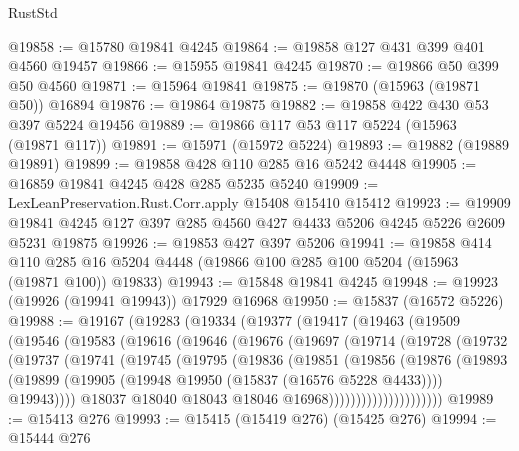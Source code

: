 \begin{lexlean}{RustStd}
\begin{coremodule}
{\begin{coremodule}
{{{{{{{{{{{{{{{{{{{{{{{{{{{{{{{{{{{{{{{{{{{{{{{{{{{{{{{{{{{{@19858 := @15780 @19841 @4245
@19864 := @19858 @127 @431 @399 @401 @4560 @19457
@19866 := @15955 @19841 @4245
@19870 := @19866 @50 @399 @50 @4560
@19871 := @15964 @19841
@19875 := @19870 (@15963 (@19871 @50)) @16894
@19876 := @19864 @19875
@19882 := @19858 @422 @430 @53 @397 @5224 @19456
@19889 := @19866 @117 @53 @117 @5224 (@15963 (@19871 @117))
@19891 := @15971 (@15972 @5224)
@19893 := @19882 (@19889 @19891)
@19899 := @19858 @428 @110 @285 @16 @5242 @4448
@19905 := @16859 @19841 @4245 @428 @285 @5235 @5240
@19909 := LexLeanPreservation.Rust.Corr.apply @15408 @15410 @15412
@19923 := @19909 @19841 @4245 @127 @397 @285 @4560 @427 @4433 @5206 @4245 @5226 @2609 @5231 @19875
@19926 := @19853 @427 @397 @5206
@19941 := @19858
    @414
    @110
    @285
    @16
    @5204
    @4448
    (@19866 @100 @285 @100 @5204 (@15963 (@19871 @100)) @19833)
@19943 := @15848 @19841 @4245
@19948 := @19923 (@19926 (@19941 @19943)) @17929 @16968
@19950 := @15837 (@16572 @5226)
@19988 := @19167
    (@19283
      (@19334
        (@19377
          (@19417
            (@19463
              (@19509
                (@19546
                  (@19583
                    (@19616
                      (@19646
                        (@19676
                          (@19697
                            (@19714
                              (@19728
                                (@19732
                                  (@19737
                                    (@19741
                                      (@19745
                                        (@19795
                                          (@19836
                                            (@19851
                                              (@19856
                                                (@19876
                                                  (@19893
                                                    (@19899
                                                      (@19905
                                                        (@19948
                                                          @19950
                                                          (@15837 (@16576 @5228 @4433))))
                                                      @19943))))
                                              @18037
                                              @18040
                                              @18043
                                              @18046
                                              @16968)))))))))))))))))))))
@19989 := @15413 @276
@19993 := @15415 (@15419 @276) (@15425 @276)
@19994 := @15444 @276
}}}}}}}}}}}}}}}}}}}}}}}}}}}}}}}}}}}}}}}}}}}}}}}}}}}}}}}}}}}}
\end{coremodule}}
\end{coremodule}
\end{lexlean}
